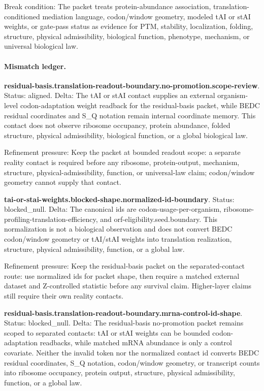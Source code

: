 Break condition: The packet treats protein-abundance association, translation-conditioned mediation language, codon/window geometry, modeled tAI or stAI weights, or gate-pass status as evidence for PTM, stability, localization, folding, structure, physical admissibility, biological function, phenotype, mechanism, or universal biological law.

\paragraph{Mismatch ledger.}
\textbf{residual-basis.translation-readout-boundary.no-promotion.scope-review}. Status: aligned. Delta: The tAI or stAI contact supplies an external organism-level codon-adaptation weight readback for the residual-basis packet, while BEDC residual coordinates and S\_Q notation remain internal coordinate memory. This contact does not observe ribosome occupancy, protein abundance, folded structure, physical admissibility, biological function, or a global biological law.

Refinement pressure: Keep the packet at bounded readout scope: a separate reality contact is required before any ribosome, protein-output, mechanism, structure, physical-admissibility, function, or universal-law claim; codon/window geometry cannot supply that contact.

\textbf{tai-or-stai-weights.blocked-shape.normalized-id-boundary}. Status: blocked\_null. Delta: The canonical ids are codon-usage-per-organism, ribosome-profiling-translation-efficiency, and orf-eligibility.seed.boundary. This normalization is not a biological observation and does not convert BEDC codon/window geometry or tAI/stAI weights into translation realization, structure, physical admissibility, function, or a global law.

Refinement pressure: Keep the residual-basis packet on the separated-contact route: use normalized ids for packet shape, then require a matched external dataset and Z-controlled statistic before any survival claim. Higher-layer claims still require their own reality contacts.

\textbf{residual-basis.translation-readout-boundary.mrna-control-id-shape}. Status: blocked\_null. Delta: The residual-basis no-promotion packet remains scoped to separated contacts: tAI or stAI weights can be bounded codon-adaptation readbacks, while matched mRNA abundance is only a control covariate. Neither the invalid token nor the normalized contact id converts BEDC residual coordinates, S\_Q notation, codon/window geometry, or transcript counts into ribosome occupancy, protein output, structure, physical admissibility, function, or a global law.

